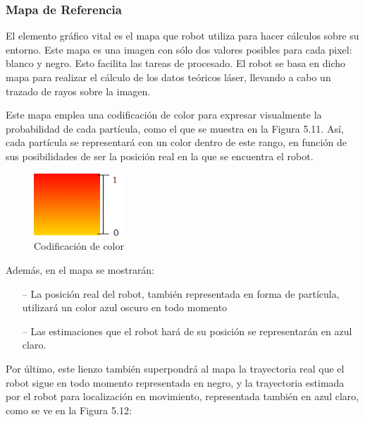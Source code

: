 \subsubsection{Mapa de Referencia}
El elemento gráfico vital es el mapa que robot utiliza para hacer cálculos sobre su entorno. Este mapa es una imagen con sólo dos valores posibles para cada pixel: blanco y negro. Esto facilita las tareas de procesado. El robot se basa en dicho mapa para realizar el cálculo de los datos teóricos láser, llevando a cabo un trazado de rayos sobre la imagen. 

Este mapa emplea una codificación de color para expresar visualmente la probabilidad de cada partícula, como el que se muestra en la Figura 5.11. Así, cada partícula se representará con un color dentro de este rango, en función de sus posibilidades de ser la posición real en la que se encuentra el robot.

\begin{figure}[H]
	\begin{center}
		\includegraphics[width=0.3\textwidth]{figures/gradcolor.png}
		\caption{Codificación de color}
		\label{fig.gradcolor}
		\end{center}
\end{figure}

Además, en el mapa se mostrarán:
\begin{itemize}
	\item[--] La posición real del robot, también representada en forma de partícula, utilizará un color azul oscuro en todo momento
	\item[--] Las estimaciones que el robot hará de su posición se representarán en azul claro.
\end{itemize}

Por último, este lienzo también superpondrá al mapa la trayectoria real que el robot sigue en todo momento representada en negro, y la trayectoria estimada por el robot para localización en movimiento, representada también en azul claro, como se ve en la Figura 5.12:

